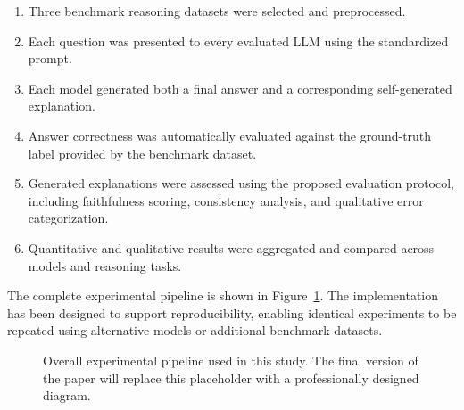 \documentclass{article}
\begin{document}
\begin{enumerate}
    \item Three benchmark reasoning datasets were selected and preprocessed.
    
    \item Each question was presented to every evaluated LLM using the standardized prompt.
    
    \item Each model generated both a final answer and a corresponding self-generated explanation.
    
    \item Answer correctness was automatically evaluated against the ground-truth label provided by the benchmark dataset.
    
    \item Generated explanations were assessed using the proposed evaluation protocol, including faithfulness scoring, consistency analysis, and qualitative error categorization.
    
    \item Quantitative and qualitative results were aggregated and compared across models and reasoning tasks.
\end{enumerate}

The complete experimental pipeline is shown in Figure~\ref{fig:pipeline}. The implementation has been designed to support reproducibility, enabling identical experiments to be repeated using alternative models or additional benchmark datasets.

\begin{figure}[h]
\centering
{}
\caption{Overall experimental pipeline used in this study. The final version of the paper will replace this placeholder with a professionally designed diagram.}
\label{fig:pipeline}
\end{figure}
\end{document}
